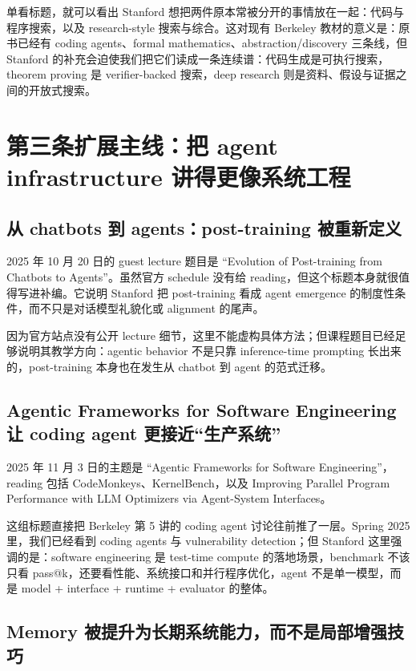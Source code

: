 单看标题，就可以看出 Stanford 想把两件原本常被分开的事情放在一起：代码与程序搜索，以及 research-style 搜索与综合。这对现有 Berkeley 教材的意义是：原书已经有 coding agents、formal mathematics、abstraction/discovery 三条线，但 Stanford 的补充会迫使我们把它们读成一条连续谱：代码生成是可执行搜索，theorem proving 是 verifier-backed 搜索，deep research 则是资料、假设与证据之间的开放式搜索。

\section{第三条扩展主线：把 agent infrastructure 讲得更像系统工程}

\subsection{从 chatbots 到 agents：post-training 被重新定义}

2025 年 10 月 20 日的 guest lecture 题目是 ``Evolution of Post-training from Chatbots to Agents''。虽然官方 schedule 没有给 reading，但这个标题本身就很值得写进补编。它说明 Stanford 把 post-training 看成 agent emergence 的制度性条件，而不只是对话模型礼貌化或 alignment 的尾声。

因为官方站点没有公开 lecture 细节，这里不能虚构具体方法；但课程题目已经足够说明其教学方向：agentic behavior 不是只靠 inference-time prompting 长出来的，post-training 本身也在发生从 chatbot 到 agent 的范式迁移。

\subsection{Agentic Frameworks for Software Engineering 让 coding agent 更接近“生产系统”}

2025 年 11 月 3 日的主题是 ``Agentic Frameworks for Software Engineering''，reading 包括 CodeMonkeys、KernelBench，以及 Improving Parallel Program Performance with LLM Optimizers via Agent-System Interfaces。

这组标题直接把 Berkeley 第 5 讲的 coding agent 讨论往前推了一层。Spring 2025 里，我们已经看到 coding agents 与 vulnerability detection；但 Stanford 这里强调的是：software engineering 是 test-time compute 的落地场景，benchmark 不该只看 pass@k，还要看性能、系统接口和并行程序优化，agent 不是单一模型，而是 model + interface + runtime + evaluator 的整体。

\subsection{Memory 被提升为长期系统能力，而不是局部增强技巧}

